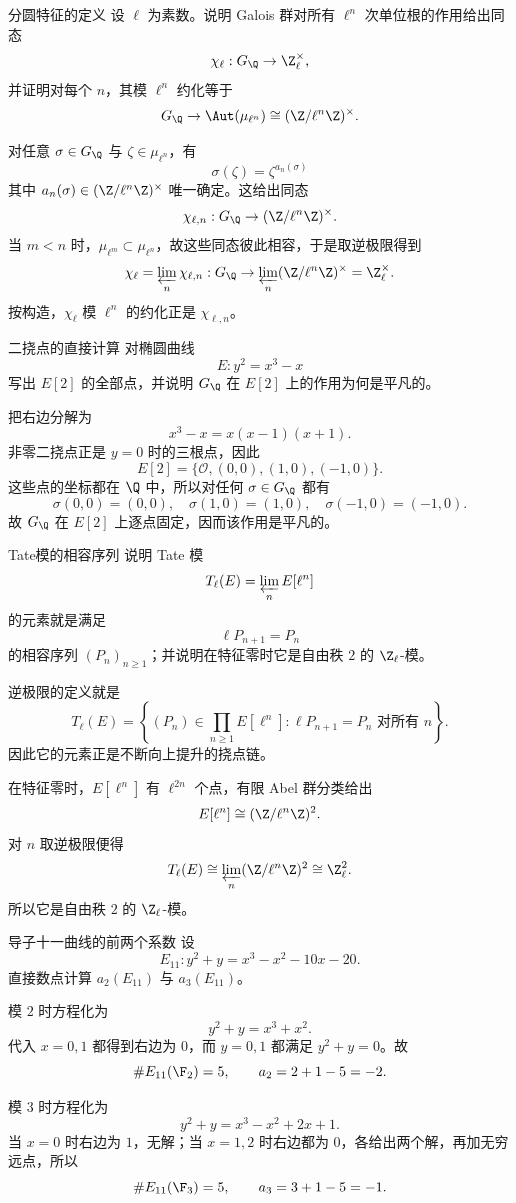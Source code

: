 \begin{problem}{分圆特征的定义}
\easy
设 $\ell$ 为素数。说明 Galois 群对所有 $\ell^n$ 次单位根的作用给出同态
\[
\chi_\ell:G_\Q\to \Z_\ell^\times,
\]
并证明对每个 $n$，其模 $\ell^n$ 约化等于
\[
G_\Q\to \Aut(\mu_{\ell^n})\cong (\Z/\ell^n\Z)^\times.
\]
\end{problem}
\begin{solution}
对任意 $\sigma\in G_\Q$ 与 $\zeta\in\mu_{\ell^n}$，有
\[
\sigma(\zeta)=\zeta^{a_n(\sigma)}
\]
其中 $a_n(\sigma)\in(\Z/\ell^n\Z)^\times$ 唯一确定。这给出同态
\[
\chi_{\ell,n}:G_\Q\to(\Z/\ell^n\Z)^\times.
\]
当 $m<n$ 时，$\mu_{\ell^m}\subset\mu_{\ell^n}$，故这些同态彼此相容，于是取逆极限得到
\[
\chi_\ell=\varprojlim_n\chi_{\ell,n}:G_\Q\to\varprojlim_n(\Z/\ell^n\Z)^\times=\Z_\ell^\times.
\]
按构造，$\chi_\ell$ 模 $\ell^n$ 的约化正是 $\chi_{\ell,n}$。
\end{solution}

\begin{problem}{二挠点的直接计算}
\easy
对椭圆曲线
\[
E:y^2=x^3-x
\]
写出 $E[2]$ 的全部点，并说明 $G_\Q$ 在 $E[2]$ 上的作用为何是平凡的。
\end{problem}
\begin{solution}
把右边分解为
\[
x^3-x=x(x-1)(x+1).
\]
非零二挠点正是 $y=0$ 时的三根点，因此
\[
E[2]=\{\mathcal O,(0,0),(1,0),(-1,0)\}.
\]
这些点的坐标都在 $\Q$ 中，所以对任何 $\sigma\in G_\Q$ 都有
\[
\sigma(0,0)=(0,0),\quad \sigma(1,0)=(1,0),\quad \sigma(-1,0)=(-1,0).
\]
故 $G_\Q$ 在 $E[2]$ 上逐点固定，因而该作用是平凡的。
\end{solution}

\begin{problem}{Tate模的相容序列}
\easy
说明 Tate 模
\[
T_\ell(E)=\varprojlim_n E[\ell^n]
\]
的元素就是满足
\[
\ell P_{n+1}=P_n
\]
的相容序列 $(P_n)_{n\ge1}$；并说明在特征零时它是自由秩 $2$ 的 $\Z_\ell$-模。
\end{problem}
\begin{solution}
逆极限的定义就是
\[
T_\ell(E)=\left\{(P_n)\in\prod_{n\ge1}E[\ell^n]:\ell P_{n+1}=P_n\text{ 对所有 }n\right\}.
\]
因此它的元素正是不断向上提升的挠点链。

在特征零时，$E[\ell^n]$ 有 $\ell^{2n}$ 个点，有限 Abel 群分类给出
\[
E[\ell^n]\cong (\Z/\ell^n\Z)^2.
\]
对 $n$ 取逆极限便得
\[
T_\ell(E)\cong \varprojlim_n(\Z/\ell^n\Z)^2\cong \Z_\ell^2.
\]
所以它是自由秩 $2$ 的 $\Z_\ell$-模。
\end{solution}

\begin{problem}{导子十一曲线的前两个系数}
\easy
设
\[
E_{11}:y^2+y=x^3-x^2-10x-20.
\]
直接数点计算 $a_2(E_{11})$ 与 $a_3(E_{11})$。
\end{problem}
\begin{solution}
模 $2$ 时方程化为
\[
y^2+y=x^3+x^2.
\]
代入 $x=0,1$ 都得到右边为 $0$，而 $y=0,1$ 都满足 $y^2+y=0$。故
\[
\#E_{11}(\F_2)=5,
\qquad
 a_2=2+1-5=-2.
\]

模 $3$ 时方程化为
\[
y^2+y=x^3-x^2+2x+1.
\]
当 $x=0$ 时右边为 $1$，无解；当 $x=1,2$ 时右边都为 $0$，各给出两个解，再加无穷远点，所以
\[
\#E_{11}(\F_3)=5,
\qquad
 a_3=3+1-5=-1.
\]
\end{solution}

